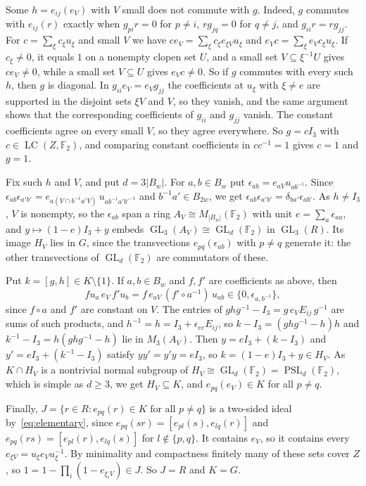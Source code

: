 \documentclass[11pt]{amsart}
\newcommand{\F}{\mathbb F}
\newcommand{\LC}{\operatorname{LC}}
\newcommand{\GL}{\operatorname{GL}}
\newcommand{\PSL}{\operatorname{PSL}}
\begin{document}
Some $h=e_{ij}(e_V)$ with $V$ small does not commute with $g$. Indeed, $g$
commutes with $e_{ij}(r)$ exactly when $g_{pi}r=0$ for $p\ne i$,
$rg_{jq}=0$ for $q\ne j$, and $g_{ii}r=rg_{jj}$. For $c=\sum_\xi c_\xi u_\xi$
and small $V$ we have $ce_V=\sum_\xi c_\xi e_{\xi V}u_\xi$ and
$e_Vc=\sum_\xi e_Vc_\xi u_\xi$. If $c_\xi\ne0$, it equals $1$ on a nonempty
clopen set $U$, and a small set $V\subseteq\xi^{-1}U$ gives $ce_V\ne0$,
while a small set $V\subseteq U$ gives $e_Vc\ne0$. So if $g$ commutes with
every such $h$, then $g$ is diagonal. In $g_{ii}e_V=e_Vg_{jj}$ the
coefficients at $u_\xi$ with $\xi\ne e$ are supported in the disjoint sets
$\xi V$ and $V$, so they vanish, and the same argument shows that the
corresponding coefficients of $g_{ii}$ and $g_{jj}$ vanish. The constant
coefficients agree on every small $V$, so they agree everywhere. So
$g=cI_3$ with $c\in\LC(Z,\F_2)$, and comparing constant coefficients in
$cc^{-1}=1$ gives $c=1$ and $g=1$.

Fix such $h$ and $V$, and put $d=3|B_w|$. For $a,b\in B_w$ put
$\epsilon_{ab}=e_{aV}u_{ab^{-1}}$. Since
$\epsilon_{ab}\epsilon_{a'b'}=e_{a(V\cap b^{-1}a'V)}\,u_{ab^{-1}a'b'^{-1}}$
and $b^{-1}a'\in B_{2w}$, we get
$\epsilon_{ab}\epsilon_{a'b'}=\delta_{ba'}\epsilon_{ab'}$. As $h\ne I_3$,
$V$ is nonempty, so the $\epsilon_{ab}$ span a ring
$A_V\cong M_{|B_w|}(\F_2)$ with unit $e=\sum_a\epsilon_{aa}$, and
$y\mapsto(1-e)I_3+y$ embeds $\GL_3(A_V)\cong\GL_d(\F_2)$ in $\GL_3(R)$. Its
image $H_V$ lies in $G$, since the transvections $e_{pq}(\epsilon_{ab})$
with $p\ne q$ generate it: the other transvections of $\GL_d(\F_2)$ are
commutators of these.

Put $k=[g,h]\in K\setminus\{1\}$. If $a,b\in B_w$ and $f,f'$ are
coefficients as above, then
\[
  fu_a\,e_V\,f'u_b=f\,e_{aV}\,(f'\circ a^{-1})\,u_{ab}
  \in\{0,\epsilon_{a,b^{-1}}\},
\]
since $f\circ a$ and $f'$ are constant on $V$. The entries of
$ghg^{-1}-I_3=g\,e_VE_{ij}\,g^{-1}$ are sums of such products, and
$h^{-1}=h=I_3+\epsilon_{ee}E_{ij}$, so $k-I_3=(ghg^{-1}-h)h$ and
$k^{-1}-I_3=h(ghg^{-1}-h)$ lie in $M_3(A_V)$. Then $y=eI_3+(k-I_3)$ and
$y'=eI_3+(k^{-1}-I_3)$ satisfy $yy'=y'y=eI_3$, so $k=(1-e)I_3+y\in H_V$.
As $K\cap H_V$ is a nontrivial normal subgroup of
$H_V\cong\GL_d(\F_2)=\PSL_d(\F_2)$, which is simple as $d\ge3$, we get
$H_V\subseteq K$, and $e_{pq}(e_V)\in K$ for all $p\ne q$.

Finally, $J=\{r\in R:e_{pq}(r)\in K\text{ for all }p\ne q\}$ is a
two-sided ideal by~\eqref{eq:elementary}, since
$e_{pq}(sr)=[e_{pl}(s),e_{lq}(r)]$ and $e_{pq}(rs)=[e_{pl}(r),e_{lq}(s)]$
for $l\notin\{p,q\}$. It contains $e_V$, so it contains every
$e_{\xi V}=u_\xi e_Vu_\xi^{-1}$. By minimality and compactness finitely many
of these sets cover $Z$, so $1=1-\prod_i(1-e_{\xi_iV})\in J$. So $J=R$ and
$K=G$.
\end{document}
